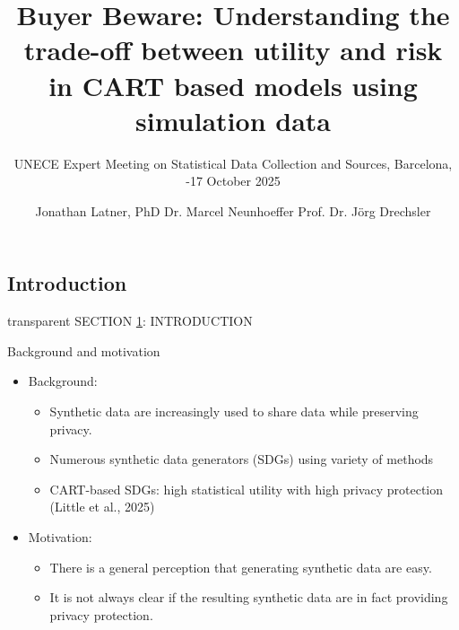 \documentclass[t,8pt,utfx8]{beamer}
\title{Buyer Beware: Understanding the trade-off between utility and risk in CART based models using simulation data}
\subtitle{UNECE Expert Meeting on Statistical Data Collection and Sources, \newline Barcelona, \newline 15-17 October 2025}
\author{Jonathan Latner, PhD \newline Dr. Marcel Neunhoeffer \newline Prof. Dr. Jörg Drechsler}
\begin{document}
\frame[plain]{\titlepage}

\begin{spacing}{1.25}

\section{Introduction}\label{sec:introduction}

\begin{frame}[c,plain]
\vskip-4mm
\begin{beamercolorbox}[wd=\boxwidth,ht=22.11mm]{transparent}%
    \vfill%
    \leftinsert%
    \MakeUppercase{Section \ref{sec:introduction}: Introduction} %
\end{beamercolorbox}
\vskip-3mm
\end{frame}

\begin{frame}{Background and motivation}
\begin{itemize}
    \item Background:
    \begin{itemize}
        \item Synthetic data are increasingly used to share data while preserving privacy.
        \item Numerous synthetic data generators (SDGs) using variety of methods
        \item CART-based SDGs: high statistical utility with high privacy protection (Little et al., 2025)
    \end{itemize}
    \item Motivation:
    \begin{itemize}
        \item There is a general perception that generating synthetic data are easy.  
        \item It is not always clear if the resulting synthetic data are in fact providing privacy protection.
    \end{itemize}

\end{itemize}
\end{frame}



\end{spacing}
\end{document}
